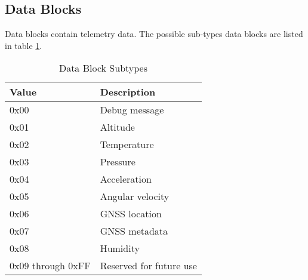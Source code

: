 \subsection{Data Blocks}

Data blocks contain telemetry data. The possible sub-types data blocks are listed in table \ref{table:data-subtypes}.

\begin{table}[H]
    \centering
    \begin{tabular}{@{}ll@{}}
        \toprule
        Value             & Description             \\
        \midrule
        0x00              & Debug message           \\
        0x01              & Altitude                \\
        0x02              & Temperature             \\
        0x03              & Pressure                \\
        0x04              & Acceleration            \\
        0x05              & Angular velocity        \\
        0x06              & GNSS location           \\
        0x07              & GNSS metadata           \\
        0x08              & Humidity                \\
        0x09 through 0xFF & Reserved for future use \\
        \bottomrule
    \end{tabular}
    \caption{Data Block Subtypes}
    \label{table:data-subtypes}
\end{table}










